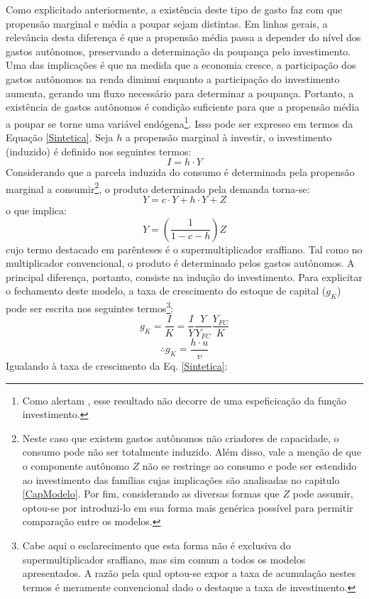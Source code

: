 Como explicitado anteriormente, a existência deste tipo de gasto faz com que propensão marginal e média a poupar sejam distintas. Em linhas gerais, a relevância desta diferença é que a propensão média passa a depender do nível dos gastos autônomos, preservando a determinação da poupança pelo investimento.  Uma das implicações é que na medida que a economia cresce, a participação dos gastos autônomos na renda diminui enquanto a participação do investimento aumenta, gerando um fluxo necessário para determinar a poupança. Portanto, a existência de gastos autônomos é condição suficiente para que a propensão média a poupar se torne uma variável endógena\footnote{Como alertam \textcite{serrano_sraffian_2017}, esse resultado não decorre de uma espeficicação da função investimento.}.
Isso pode ser expresso em termos da Equação \ref{Sintetica}. Seja $h$ a propensão marginal à investir, o investimento (induzido) é definido nos seguintes termos:
$$
I = h\cdot Y
$$
Considerando que a parcela induzida do consumo é determinada pela propensão marginal a consumir\footnote{Neste caso que existem gastos autônomos não criadores de capacidade, o consumo pode não ser totalmente induzido. Além disso, vale a menção de que o componente autônomo $Z$ não se restringe ao consumo e pode ser estendido ao investimento das famílias cujas implicações são analisadas no capitulo \ref{CapModelo}. Por fim, considerando as diversas formas que $Z$ pode assumir, optou-se por introduzi-lo em sua forma mais genérica possível para permitir comparação entre os modelos.}, o produto determinado pela demanda torna-se:
\begin{equation}
\label{PIBSuper}
    Y = c\cdot Y + h\cdot Y + Z
\end{equation}
o que implica:
\begin{equation}
\label{Supermultiplicador}
Y = \left(\frac{1}{1 - c - h}\right)Z
\end{equation}
cujo termo destacado em parênteses é o supermultiplicador sraffiano. Tal como no multiplicador convencional, o produto é determinado pelos gastos autônomos. A principal diferença, portanto, consiste na indução do investimento. Para explicitar o fechamento deste modelo, a taxa de crescimento do estoque de capital ($g_K$) pode ser escrita nos seguintes termos\footnote{Cabe aqui o esclarecimento que esta forma não é exclusiva do supermultiplicador sraffiano, mas sim comum a todos os modelos apresentados. A razão pela qual optou-se expor a taxa de acumulação nestes termos é meramente convencional dado o destaque a taxa de investimento.}:
$$
g_K = \frac{I}{K} = \frac{I}{Y}\frac{Y}{Y_{FC}}\frac{Y_{FC}}{K}
$$
$$
\therefore g_K = \frac{h\cdot u}{v}
$$
Igualando à taxa de crescimento da Eq. \ref{Sintetica}:

